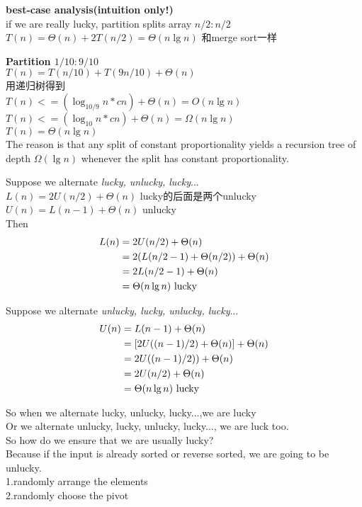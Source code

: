 \documentclass{article}
\begin{document}
\textbf{best-case analysis(intuition only!)}\\
if we are really lucky, partition splits array $n/2:n/2$\\
$T(n)=\Theta(n)+2T(n/2)=\Theta(n\lg n)$  和merge sort一样

\textbf{Partition $1/10:9/10$}\\
$T(n)=T(n/10)+T(9n/10)+\Theta(n)$\\
用递归树得到\\
$T(n)<=(\log_{10/9}n*cn)+\Theta(n)=O(n\lg n)$\\
$T(n)<=(\log_{10}n*cn)+\Theta(n)=\Omega(n\lg n)$\\
$T(n)=\Theta(n\lg n)$\\
The reason is that any split of constant proportionality yields a recursion tree of depth $\Omega(\lg n)$ whenever the split has constant proportionality.

Suppose we alternate \textit{lucky, unlucky, lucky}...\\
$L(n)=2U(n/2)+\Theta(n)$	lucky的后面是两个unlucky\\
$U(n)=L(n-1)+\Theta(n)$	unlucky\\
Then
$$
\begin{aligned}
L(n)
&=2U(n/2)+\Theta(n) \\
&=2(L(n/2 - 1) +\Theta(n/2))+\Theta(n)\\
&=2L(n/2 - 1) + \Theta(n)\\
&=\Theta(n\lg n)  \text{ lucky }
\end{aligned}
$$

Suppose we alternate \textit{unlucky, lucky, unlucky, lucky}...
$$
\begin{aligned}
U(n)
&=L(n-1) + \Theta(n) \\
&=[2U((n-1)/2) + \Theta(n)] +\Theta(n)\\
&=2U((n-1)/2)) + \Theta(n)\\
&=2U(n/2) + \Theta(n)\\
&=\Theta(n\lg n)  \text{ lucky }
\end{aligned}
$$

So when we alternate lucky, unlucky, lucky...,we are lucky\\
Or we alternate unlucky, lucky, unlucky, lucky..., we are luck too.\\
So how do we ensure that we are usually lucky? \\
Because if the input is already sorted or reverse sorted, we are going to be unlucky.\\
1.randomly arrange the elements\\
2.randomly choose the pivot
\end{document}
